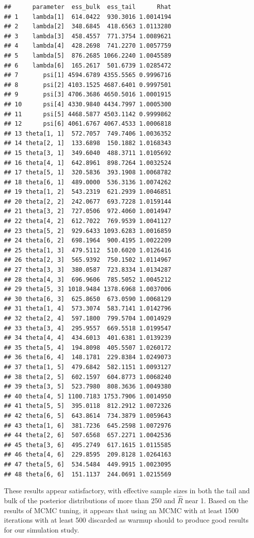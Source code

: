 \documentclass[
]{article}
\begin{document}
\begin{verbatim}
##      parameter  ess_bulk  ess_tail      Rhat
## 1    lambda[1]  614.0422  930.3016 1.0014194
## 2    lambda[2]  348.6845  418.6563 1.0113280
## 3    lambda[3]  458.4557  771.3754 1.0089621
## 4    lambda[4]  428.2698  741.2270 1.0057759
## 5    lambda[5]  876.2685 1066.2240 1.0045589
## 6    lambda[6]  165.2617  501.6739 1.0285472
## 7       psi[1] 4594.6789 4355.5565 0.9996716
## 8       psi[2] 4103.1525 4687.6401 0.9997501
## 9       psi[3] 4706.3686 4650.5016 1.0001915
## 10      psi[4] 4330.9840 4434.7997 1.0005300
## 11      psi[5] 4468.5877 4503.1142 0.9999862
## 12      psi[6] 4061.6767 4067.4533 1.0006818
## 13 theta[1, 1]  572.7057  749.7406 1.0036352
## 14 theta[2, 1]  133.6898  150.1882 1.0168343
## 15 theta[3, 1]  349.6040  488.3711 1.0105692
## 16 theta[4, 1]  642.8961  898.7264 1.0032524
## 17 theta[5, 1]  320.5836  393.1908 1.0068782
## 18 theta[6, 1]  489.0000  536.3136 1.0074262
## 19 theta[1, 2]  543.2319  621.2939 1.0046851
## 20 theta[2, 2]  242.0677  693.7228 1.0159144
## 21 theta[3, 2]  727.0506  972.4060 1.0014947
## 22 theta[4, 2]  612.7022  769.9539 1.0041127
## 23 theta[5, 2]  929.6433 1093.6283 1.0016859
## 24 theta[6, 2]  698.1964  900.4195 1.0022209
## 25 theta[1, 3]  479.5112  510.6020 1.0126416
## 26 theta[2, 3]  565.9392  750.1502 1.0114967
## 27 theta[3, 3]  380.0587  723.8334 1.0134287
## 28 theta[4, 3]  696.9606  785.5052 1.0045212
## 29 theta[5, 3] 1018.9484 1378.6968 1.0037006
## 30 theta[6, 3]  625.8650  673.0590 1.0068129
## 31 theta[1, 4]  573.3074  583.7141 1.0142796
## 32 theta[2, 4]  597.1800  799.5704 1.0014929
## 33 theta[3, 4]  295.9557  669.5518 1.0199547
## 34 theta[4, 4]  434.6013  401.6381 1.0139239
## 35 theta[5, 4]  194.8098  405.5507 1.0260172
## 36 theta[6, 4]  148.1781  229.8384 1.0249073
## 37 theta[1, 5]  479.6842  582.1151 1.0093127
## 38 theta[2, 5]  602.1597  604.8773 1.0068240
## 39 theta[3, 5]  523.7980  808.3636 1.0049380
## 40 theta[4, 5] 1100.7183 1753.7906 1.0014950
## 41 theta[5, 5]  395.0118  812.2912 1.0072326
## 42 theta[6, 5]  643.8614  734.3879 1.0059643
## 43 theta[1, 6]  381.7236  645.2598 1.0072976
## 44 theta[2, 6]  507.6568  657.2271 1.0042536
## 45 theta[3, 6]  495.2749  617.1615 1.0115585
## 46 theta[4, 6]  229.8595  209.8128 1.0264163
## 47 theta[5, 6]  534.5484  449.9915 1.0023095
## 48 theta[6, 6]  151.1137  244.0691 1.0215569
\end{verbatim}

\linespread{1}

These results appear satisfactory, with effective sample sizes in both the tail and bulk of the posterior distributions of more than 250 and \(\hat{R}\) near 1. Based on the results of MCMC tuning, it appears that using an MCMC with at least 1500 iterations with at least 500 discarded as warmup should to produce good results for our simulation study.
\end{document}
